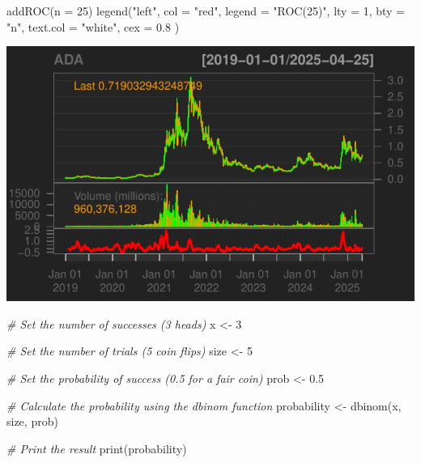 \documentclass[]{tufte-handout}
\newenvironment{Shaded}{}{}
\newcommand{\AttributeTok}[1]{\textcolor[rgb]{0.49,0.56,0.16}{#1}}
\newcommand{\CommentTok}[1]{\textcolor[rgb]{0.38,0.63,0.69}{\textit{#1}}}
\newcommand{\DecValTok}[1]{\textcolor[rgb]{0.25,0.63,0.44}{#1}}
\newcommand{\FloatTok}[1]{\textcolor[rgb]{0.25,0.63,0.44}{#1}}
\newcommand{\FunctionTok}[1]{\textcolor[rgb]{0.02,0.16,0.49}{#1}}
\newcommand{\NormalTok}[1]{#1}
\newcommand{\OtherTok}[1]{\textcolor[rgb]{0.00,0.44,0.13}{#1}}
\newcommand{\StringTok}[1]{\textcolor[rgb]{0.25,0.44,0.63}{#1}}
\begin{document}
\begin{Shaded}
\begin{Highlighting}[]
\FunctionTok{addROC}\NormalTok{(}\AttributeTok{n =} \DecValTok{25}\NormalTok{)}
\FunctionTok{legend}\NormalTok{(}\StringTok{"left"}\NormalTok{,}
  \AttributeTok{col =} \StringTok{"red"}\NormalTok{, }\AttributeTok{legend =} \StringTok{"ROC(25)"}\NormalTok{, }\AttributeTok{lty =} \DecValTok{1}\NormalTok{, }\AttributeTok{bty =} \StringTok{"n"}\NormalTok{,}
  \AttributeTok{text.col =} \StringTok{"white"}\NormalTok{, }\AttributeTok{cex =} \FloatTok{0.8}
\NormalTok{)}
\end{Highlighting}
\end{Shaded}

\includegraphics{cripto_update_files/figure-latex/unnamed-chunk-12-10}

\begin{Shaded}
\begin{Highlighting}[]
\CommentTok{\# Set the number of successes (3 heads)}
\NormalTok{x }\OtherTok{\textless{}{-}} \DecValTok{3}

\CommentTok{\# Set the number of trials (5 coin flips)}
\NormalTok{size }\OtherTok{\textless{}{-}} \DecValTok{5}

\CommentTok{\# Set the probability of success (0.5 for a fair coin)}
\NormalTok{prob }\OtherTok{\textless{}{-}} \FloatTok{0.5}

\CommentTok{\# Calculate the probability using the dbinom function}
\NormalTok{probability }\OtherTok{\textless{}{-}} \FunctionTok{dbinom}\NormalTok{(x, size, prob)}

\CommentTok{\# Print the result}
\FunctionTok{print}\NormalTok{(probability)}
\end{Highlighting}
\end{Shaded}
\end{document}
